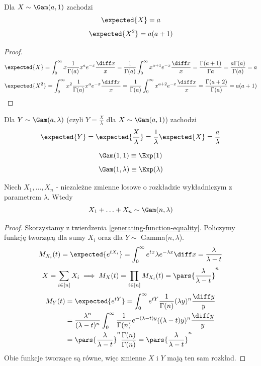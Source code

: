 \begin{fact}
    Dla \( X \sim \Gam(a, 1)\) zachodzi
    \[ 
        \expected{X} = a 
    \] 
    \[ 
        \expected{X^2} = a(a+1) 
    \]
\end{fact}
\begin{proof}
    \[
        \expected{X} = \int_0^{\infty} x \frac{1}{\Gamma(a)} x^a e^{-x} \frac{\diff x}{x} = \frac{1}{\Gamma(a)} \int_0^{\infty} x^{a+1} e^{-x} \frac{\diff x}{x} = \frac{\Gamma(a+1)}{\Gamma{a}} = \frac{a\Gamma(a)}{\Gamma(a)} = a
    \]
    \[
        \expected{X^2} = \int_0^{\infty} x^2 \frac{1}{\Gamma(a)} x^a e^{-x} \frac{\diff x}{x} = \frac{1}{\Gamma(a)} \int_0^{\infty} x^{a+2} e^{-x} \frac{\diff x}{x} = \frac{\Gamma(a+2)}{\Gamma(a)} = a(a+1)
    \]
\end{proof}

\begin{fact}
    Dla \( Y \sim \Gam(a, \lambda)\) (czyli \(Y = \frac{X}{\lambda} \) dla \( X \sim \Gam(a, 1)\)) zachodzi
    \[
        \expected{Y} = \expected{\frac{X}{\lambda}} = \frac{1}{\lambda}\expected{X} = \frac{a}{\lambda}
    \]
\end{fact}

\begin{fact}
	\[
		\Gam(1, 1) \equiv \Exp(1)
	\]
    \[
		\Gam(1, \lambda) \equiv \Exp(\lambda)	
	\]
\end{fact}

\begin{theorem}
    Niech \(X_1, \ldots, X_n\) - niezależne zmienne losowe o rozkładzie wykładniczym z parametrem \( \lambda \). Wtedy
    \[ X_1 + \ldots + X_n \sim \Gam(n, \lambda) \]
\end{theorem}
\begin{proof}
    Skorzystamy z twierdzenia \ref{generating-function-equality}. Policzymy funkcję tworzącą dla sumy \(X_i\) oraz dla \(Y \sim \) Gamma(\(n, \lambda\)).
    \[
        M_{X_i}(t) = \expected{e^{tX_i}} = \int_0^{\infty} e^{tx} \lambda e^{-\lambda x} \diff x = \frac{\lambda}{\lambda - t}
    \]
    \[
        X = \sum_{i \in [n]}X_i \implies M_X(t) = \prod_{i \in [n]} M_{X_i}(t) = \pars{\frac{\lambda}{\lambda - t}}^n
    \]
    \begin{align*}
        M_Y(t) &= \expected{e^{tY}} = \int_0^{\infty} e^{tY} \frac{1}{\Gamma(n)} (\lambda y)^n \frac{\diff y}{y} \\
        &= \frac{\lambda^n}{(\lambda - t)^n}\int_0^{\infty} \frac{1}{\Gamma(n)} e^{-(\lambda - t)y}((\lambda - t)y)^n \frac{\diff y}{y} \\
        &= \pars{\frac{\lambda}{\lambda - t}}^n \frac{\Gamma(n)}{\Gamma(n)} = \pars{\frac{\lambda}{\lambda - t}}^n
    \end{align*}
    Obie funkcje tworzące są równe, więc zmienne \( X \) i \( Y \) mają ten sam rozkład.
\end{proof}
